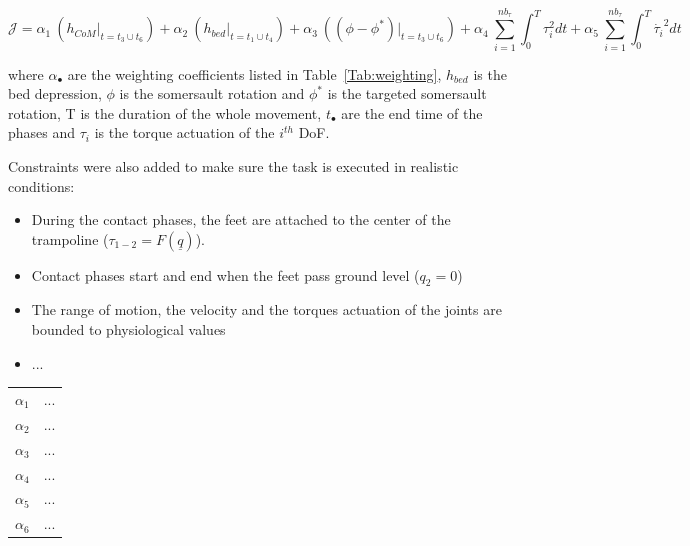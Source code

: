 \[
\mathcal{J} = \alpha_1~(h_{CoM} \big\rvert_{t = t_3 \cup t_6}) + \alpha_2~(h_{bed} \big\rvert_{t = t_1 \cup t_4}) + \alpha_3~((\phi - \phi^*) \big\rvert_{t = t_3 \cup t_6}) + \alpha_4~\sum_{i=1}^{nb_{\tau}} \int_0^T \tau_{i}^2 dt + \alpha_5~\sum_{i=1}^{nb_{\tau}}  \int_0^T \dot{\tau_{i}}^2 dt \label{eq:ocp}
\]

\noindent where $\alpha_\bullet$ are the weighting coefficients listed in Table~\ref{Tab:weighting}, $h_{bed}$ is the bed depression, $\phi$ is the somersault rotation and $\phi^*$ is the targeted somersault rotation, T is the duration of the whole movement, $t_{\bullet}$ are the end time of the phases and $\tau_i$ is the torque actuation of the $i^{th}$ DoF.


Constraints were also added to make sure the task is executed in realistic conditions: 
\begin{itemize}
\item During the contact phases, the feet are attached to the center of the trampoline ($\tau_{1-2} = F(\underline{q})$).
\item Contact phases start and end when the feet pass ground level ($q_2 = 0$)
\item The range of motion, the velocity and the torques actuation of the joints are bounded to physiological values
\item ...
\end{itemize}


\begin{center}
\begin{tabular}{ c c }
 $\alpha_1$ & ... \\ 
 $\alpha_2$ & ... \\ 
 $\alpha_3$ & ... \\ 
 $\alpha_4$ & ... \\ 
 $\alpha_5$ & ... \\ 
 $\alpha_6$ & ...
\end{tabular}
\label{Tab:weighting}
\end{center}


